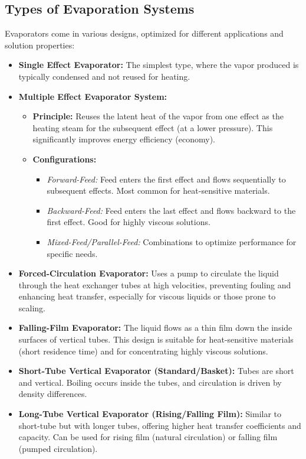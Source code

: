 \subsection{Types of Evaporation Systems}
Evaporators come in various designs, optimized for different applications and solution properties:
\begin{itemize}
    \item \textbf{Single Effect Evaporator:} The simplest type, where the vapor produced is typically condensed and not reused for heating.
    \item \textbf{Multiple Effect Evaporator System:}
        \begin{itemize}
            \item \textbf{Principle:} Reuses the latent heat of the vapor from one effect as the heating steam for the subsequent effect (at a lower pressure). This significantly improves energy efficiency (economy).
            \item \textbf{Configurations:}
                \begin{itemize}
                    \item \textit{Forward-Feed:} Feed enters the first effect and flows sequentially to subsequent effects. Most common for heat-sensitive materials.
                    \item \textit{Backward-Feed:} Feed enters the last effect and flows backward to the first effect. Good for highly viscous solutions.
                    \item \textit{Mixed-Feed/Parallel-Feed:} Combinations to optimize performance for specific needs.
                \end{itemize}
        \end{itemize}
    \item \textbf{Forced-Circulation Evaporator:} Uses a pump to circulate the liquid through the heat exchanger tubes at high velocities, preventing fouling and enhancing heat transfer, especially for viscous liquids or those prone to scaling.
    \item \textbf{Falling-Film Evaporator:} The liquid flows as a thin film down the inside surfaces of vertical tubes. This design is suitable for heat-sensitive materials (short residence time) and for concentrating highly viscous solutions.
    \item \textbf{Short-Tube Vertical Evaporator (Standard/Basket):} Tubes are short and vertical. Boiling occurs inside the tubes, and circulation is driven by density differences.
    \item \textbf{Long-Tube Vertical Evaporator (Rising/Falling Film):} Similar to short-tube but with longer tubes, offering higher heat transfer coefficients and capacity. Can be used for rising film (natural circulation) or falling film (pumped circulation).
\end{itemize}

